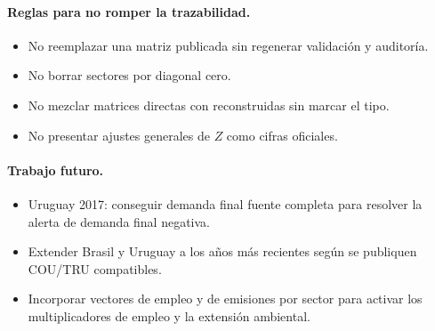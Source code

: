 \documentclass[11pt,a4paper]{article}
\begin{document}
\paragraph{Reglas para no romper la trazabilidad.}
\begin{itemize}[leftmargin=1.6em,nosep]
  \item No reemplazar una matriz publicada sin regenerar validación y auditoría.
  \item No borrar sectores por diagonal cero.
  \item No mezclar matrices directas con reconstruidas sin marcar el tipo.
  \item No presentar ajustes generales de $Z$ como cifras oficiales.
\end{itemize}

\paragraph{Trabajo futuro.}
\begin{itemize}[leftmargin=1.6em,nosep]
  \item Uruguay 2017: conseguir demanda final fuente completa para resolver la
        alerta de demanda final negativa.
  \item Extender Brasil y Uruguay a los años más recientes según se publiquen
        COU/TRU compatibles.
  \item Incorporar vectores de empleo y de emisiones por sector para activar los
        multiplicadores de empleo y la extensión ambiental.
\end{itemize}
\end{document}
